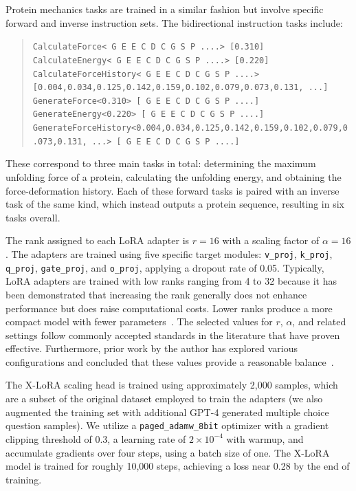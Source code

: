 Protein mechanics tasks are trained in a similar fashion but involve specific forward and inverse instruction sets. The bidirectional instruction tasks include:

\begin{quote}
\tiny {\texttt{CalculateForce< G E E C D C G S P ....> [0.310]\\
CalculateEnergy< G E E C D C G S P ....> [0.220]\\ 
CalculateForceHistory< G E E C D C G S P ....> [0.004,0.034,0.125,0.142,0.159,0.102,0.079,0.073,0.131, ...]\\
GenerateForce<0.310>\,[ G E E C D C G S P ....]\\
GenerateEnergy<0.220>\,[ G E E C D C G S P ....]\\
GenerateForceHistory<0.004,0.034,0.125,0.142,0.159,0.102,0.079,0.073,0.131, ...>\,[ G E E C D C G S P ....] }}
\end{quote}

These correspond to three main tasks in total: determining the maximum unfolding force of a protein, calculating the unfolding energy, and obtaining the force-deformation history. Each of these forward tasks is paired with an inverse task of the same kind, which instead outputs a protein sequence, resulting in six tasks overall.

The rank assigned to each LoRA adapter is $r=16$ with a scaling factor of $\alpha=16$. The adapters are trained using five specific target modules: \texttt{v\_proj}, \texttt{k\_proj}, \texttt{q\_proj}, \texttt{gate\_proj}, and \texttt{o\_proj}, applying a dropout rate of 0.05. Typically, LoRA adapters are trained with low ranks ranging from 4 to 32 because it has been demonstrated that increasing the rank generally does not enhance performance but does raise computational costs. Lower ranks produce a more compact model with fewer parameters~\cite{hu2021lora}. The selected values for $r$, $\alpha$, and related settings follow commonly accepted standards in the literature that have proven effective. Furthermore, prior work by the author has explored various configurations and concluded that these values provide a reasonable balance~\cite{Luu2023BioinspiredLLM:Materials}.

The X-LoRA scaling head is trained using approximately 2,000 samples, which are a subset of the original dataset employed to train the adapters (we also augmented the training set with additional GPT-4 generated multiple choice question samples). We utilize a \texttt{paged\_adamw\_8bit} optimizer with a gradient clipping threshold of 0.3, a learning rate of $2\times 10^{-4}$ with warmup, and accumulate gradients over four steps, using a batch size of one. The X-LoRA model is trained for roughly 10,000 steps, achieving a loss near 0.28 by the end of training.

